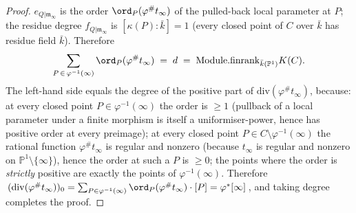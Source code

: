 \begin{proof}
  \(e_{Q | \mathfrak m_\infty}\) is the order \(\ord_P(\varphi^{\#} t_\infty)\)
  of the pulled-back local parameter at \(P\); the residue degree
  \(f_{Q | \mathfrak m_\infty}\) is \([\kappa(P) : \bar k] = 1\) (every closed
  point of \(C\) over \(\bar k\) has residue field \(\bar k\)). Therefore
  \[
    \sum_{P \,\in\, \varphi^{-1}(\infty)} \ord_P(\varphi^{\#} t_\infty) \;=\; d
    \;=\; \mathrm{Module.finrank}_{\bar k(\mathbb P^1)} K(C).
  \]
  The left-hand side equals the degree of the positive part of
  \(\mathrm{div}(\varphi^{\#} t_\infty)\), because: at every closed point
  \(P \in \varphi^{-1}(\infty)\) the order is \(\geq 1\) (pullback of a local
  parameter under a finite morphism is itself a uniformiser-power, hence
  has positive order at every preimage); at every closed point
  \(P \in C \setminus \varphi^{-1}(\infty)\) the rational function
  \(\varphi^{\#} t_\infty\) is regular and nonzero (because \(t_\infty\) is
  regular and nonzero on \(\mathbb P^1 \setminus \{\infty\}\)), hence the
  order at such a \(P\) is \(\geq 0\); the points where the order is
  \emph{strictly} positive are exactly the points of \(\varphi^{-1}(\infty)\).
  Therefore
  \(\,(\mathrm{div}(\varphi^{\#} t_\infty))_0 = \sum_{P \in \varphi^{-1}(\infty)}
  \ord_P(\varphi^{\#} t_\infty) \cdot [P] = \varphi^{*}[\infty]\,\), and
  taking degree completes the proof.
\end{proof}
